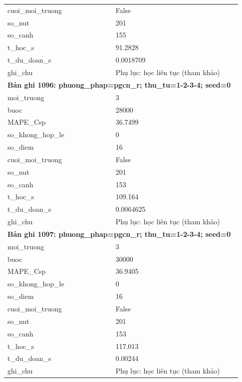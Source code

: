 \begin{longtable}{p{0.43\linewidth}p{0.50\linewidth}}
cuoi\_\allowbreak moi\_\allowbreak truong & False \\
so\_\allowbreak nut & 201 \\
so\_\allowbreak canh & 155 \\
t\_\allowbreak hoc\_\allowbreak s & 91.2828 \\
t\_\allowbreak du\_\allowbreak doan\_\allowbreak s & 0.0018709 \\
ghi\_\allowbreak chu & Phụ lục: học liên tục (tham khảo) \\
\midrule
\multicolumn{2}{p{0.95\linewidth}}{\textbf{Bản ghi 1096: phuong\_phap=pgcn\_r; thu\_tu=1-2-3-4; seed=0}} \\
moi\_\allowbreak truong & 3 \\
buoc & 28000 \\
MAPE\_\allowbreak Csp & 36.7499 \\
so\_\allowbreak khong\_\allowbreak hop\_\allowbreak le & 0 \\
so\_\allowbreak diem & 16 \\
cuoi\_\allowbreak moi\_\allowbreak truong & False \\
so\_\allowbreak nut & 201 \\
so\_\allowbreak canh & 153 \\
t\_\allowbreak hoc\_\allowbreak s & 109.164 \\
t\_\allowbreak du\_\allowbreak doan\_\allowbreak s & 0.0064625 \\
ghi\_\allowbreak chu & Phụ lục: học liên tục (tham khảo) \\
\midrule
\multicolumn{2}{p{0.95\linewidth}}{\textbf{Bản ghi 1097: phuong\_phap=pgcn\_r; thu\_tu=1-2-3-4; seed=0}} \\
moi\_\allowbreak truong & 3 \\
buoc & 30000 \\
MAPE\_\allowbreak Csp & 36.9405 \\
so\_\allowbreak khong\_\allowbreak hop\_\allowbreak le & 0 \\
so\_\allowbreak diem & 16 \\
cuoi\_\allowbreak moi\_\allowbreak truong & False \\
so\_\allowbreak nut & 201 \\
so\_\allowbreak canh & 153 \\
t\_\allowbreak hoc\_\allowbreak s & 117.013 \\
t\_\allowbreak du\_\allowbreak doan\_\allowbreak s & 0.00244 \\
ghi\_\allowbreak chu & Phụ lục: học liên tục (tham khảo) \\

\end{longtable}

